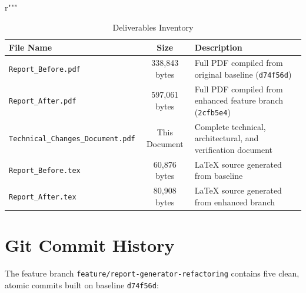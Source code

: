 r"""\documentclass[11pt,a4paper]{article}
\begin{document}
\begin{table}[h!]
\centering
\small
\begin{tabular}{|l|c|l|}
\hline
\textbf{File Name} & \textbf{Size} & \textbf{Description} \\
\hline
\texttt{Report\_Before.pdf} & 338,843 bytes & Full PDF compiled from original baseline (\texttt{d74f56d}) \\
\texttt{Report\_After.pdf} & 597,061 bytes & Full PDF compiled from enhanced feature branch (\texttt{2cfb5e4}) \\
\texttt{Technical\_Changes\_Document.pdf} & This Document & Complete technical, architectural, and verification document \\
\texttt{Report\_Before.tex} & 60,876 bytes & LaTeX source generated from baseline \\
\texttt{Report\_After.tex} & 80,908 bytes & LaTeX source generated from enhanced branch \\
\hline
\end{tabular}
\caption{Deliverables Inventory}
\end{table}

\section{Git Commit History}

The feature branch \texttt{feature/report-generator-refactoring} contains five clean, atomic commits built on baseline \texttt{d74f56d}:
\end{document}
